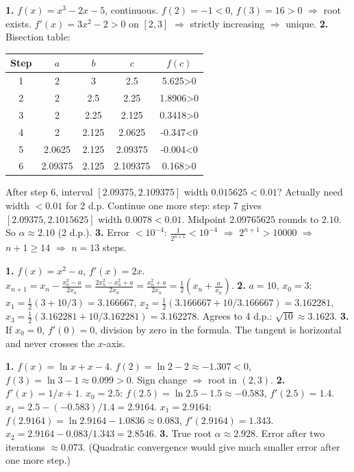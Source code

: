 \documentclass[11pt]{article}
\begin{document}
\begin{corrige}[Exercise 1]
\textbf{1.} $f(x)=x^3-2x-5$, continuous. $f(2)=-1<0$, $f(3)=16>0$ $\Rightarrow$ root exists. $f'(x)=3x^2-2>0$ on $[2,3]$ $\Rightarrow$ strictly increasing $\Rightarrow$ unique.
\textbf{2.} Bisection table:
\begin{center}
\begin{tabular}{|c|c|c|c|c|}
\hline
\rowcolor{popblueL} Step & $a$ & $b$ & $c$ & $f(c)$ \\
\hline
1 & 2 & 3 & 2.5 & 5.625>0 \\
\hline
2 & 2 & 2.5 & 2.25 & 1.8906>0 \\
\hline
3 & 2 & 2.25 & 2.125 & 0.3418>0 \\
\hline
4 & 2 & 2.125 & 2.0625 & -0.347<0 \\
\hline
5 & 2.0625 & 2.125 & 2.09375 & -0.004<0 \\
\hline
6 & 2.09375 & 2.125 & 2.109375 & 0.168>0 \\
\hline
\end{tabular}
\end{center}
After step 6, interval $[2.09375, 2.109375]$ width $0.015625<0.01$? Actually need width $<0.01$ for 2 d.p. Continue one more step: step 7 gives $[2.09375, 2.1015625]$ width $0.0078<0.01$. Midpoint $2.09765625$ rounds to $2.10$. So $\alpha\approx 2.10$ (2 d.p.).
\textbf{3.} Error $<10^{-4}$: $\frac{1}{2^{n+1}}<10^{-4}$ $\Rightarrow$ $2^{n+1}>10000$ $\Rightarrow$ $n+1\ge14$ $\Rightarrow$ $n=13$ steps.
\end{corrige}

\begin{corrige}[Exercise 2]
\textbf{1.} $f(x)=x^2-a$, $f'(x)=2x$. $x_{n+1}=x_n-\frac{x_n^2-a}{2x_n}=\frac{2x_n^2-x_n^2+a}{2x_n}=\frac{x_n^2+a}{2x_n}=\frac{1}{2}\left(x_n+\frac{a}{x_n}\right)$.
\textbf{2.} $a=10$, $x_0=3$: $x_1=\frac{1}{2}(3+10/3)=3.166667$, $x_2=\frac{1}{2}(3.166667+10/3.166667)=3.162281$, $x_3=\frac{1}{2}(3.162281+10/3.162281)=3.162278$. Agrees to 4 d.p.: $\sqrt{10}\approx 3.1623$.
\textbf{3.} If $x_0=0$, $f'(0)=0$, division by zero in the formula. The tangent is horizontal and never crosses the $x$-axis.
\end{corrige}

\begin{corrige}[Exercise 3]
\textbf{1.} $f(x)=\ln x + x - 4$. $f(2)=\ln2-2\approx -1.307<0$, $f(3)=\ln3-1\approx 0.099>0$. Sign change $\Rightarrow$ root in $(2,3)$.
\textbf{2.} $f'(x)=1/x+1$. $x_0=2.5$: $f(2.5)=\ln2.5-1.5\approx -0.583$, $f'(2.5)=1.4$. $x_1=2.5-(-0.583)/1.4=2.9164$. $x_1=2.9164$: $f(2.9164)=\ln2.9164-1.0836\approx 0.083$, $f'(2.9164)=1.343$. $x_2=2.9164-0.083/1.343=2.8546$.
\textbf{3.} True root $\alpha\approx 2.928$. Error after two iterations $\approx 0.073$. (Quadratic convergence would give much smaller error after one more step.)
\end{corrige}
\end{document}
